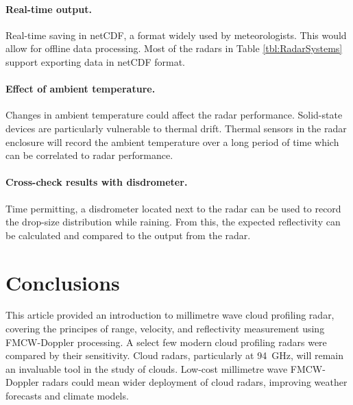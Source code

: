 \documentclass{article}
\begin{document}
\paragraph{Real-time output.} Real-time saving in netCDF,\supercite{NetCDFFormat} a format widely used by meteorologists. This would allow for offline data processing. Most of the radars in Table \ref{tbl:RadarSystems} support exporting data in netCDF format.
\paragraph{Effect of ambient temperature.} Changes in ambient temperature could affect the radar performance. Solid-state devices are particularly vulnerable to thermal drift. Thermal sensors in the radar enclosure will record the ambient temperature over a long period of time which can be correlated to radar performance.
\paragraph{Cross-check results with disdrometer.} Time permitting, a disdrometer located next to the radar can be used to record the drop-size distribution while raining. From this, the expected reflectivity can be calculated and compared to the output from the radar.

\section{Conclusions}
This article provided an introduction to millimetre wave cloud profiling radar, covering the principes of range, velocity, and reflectivity measurement using FMCW-Doppler processing. A select few modern cloud profiling radars were compared by their sensitivity.
Cloud radars, particularly at \SI{94}{\giga\hertz}, will remain an invaluable tool in the study of clouds. Low-cost millimetre wave FMCW-Doppler radars could mean wider deployment of cloud radars, improving weather forecasts and climate models.

\printbibliography
\end{document}
